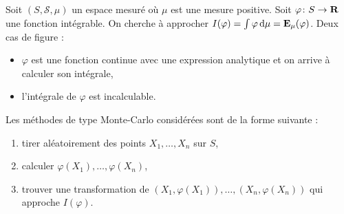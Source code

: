 
Soit $(S,\mathcal{S},\mu)$ un espace mesuré où $\mu$ est une mesure positive.
Soit $\varphi \colon S \to \mathbf{R}$ une fonction intégrable.
On cherche à approcher $I(\varphi) = \int \varphi \mathop{}\mathopen{}\mathrm{d} \mu = \mathbf{E}_\mu(\varphi)$.
Deux cas de figure :
\begin{itemize}
	\item[\textbullet] $\varphi$ est une fonction continue avec une expression analytique et on arrive à calculer son intégrale,
	\item[\textbullet] l'intégrale de $\varphi$ est incalculable.
\end{itemize}

Les méthodes de type Monte-Carlo considérées sont de la forme suivante :
\begin{enumerate}
	\item tirer aléatoirement des points $X_1,\ldots,X_n$ sur $S$,
	\item calculer $\varphi(X_1),\ldots,\varphi(X_n)$,
	\item trouver une transformation de $(X_1, \varphi(X_1)),\ldots,(X_n, \varphi(X_n))$ qui approche $I(\varphi)$.
\end{enumerate}